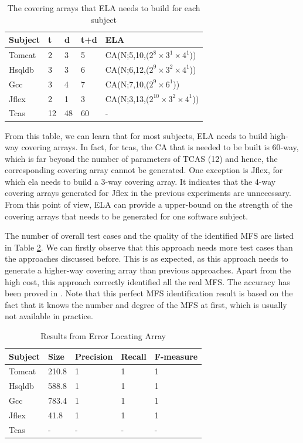 \documentclass[10pt,journal,compsoc]{IEEEtran}
\begin{document}
{\begin{table}[htbp]
\center
\caption{The covering arrays that ELA needs to build for each subject}
\label{ela-needs-to-gen}
\begin{tabular}{|l|l|l|l|l|}
\hline
Subject & t  & d  & t+d & ELA                       \\\hline
Tomcat  & 2  & 3  & 5   & CA(N;5,10,($2^{8} \times 3^{1} \times 4^{1}$))  \\
Hsqldb  & 3  & 3  & 6   & CA(N;6,12,($2^{9} \times 3^{2} \times 4^{1}$))  \\
Gcc     & 3  & 4  & 7   & CA(N;7,10,($2^{9} \times 6^{1}$))      \\
Jflex   & 2  & 1  & 3   & CA(N;3,13,($2^{10} \times 3^{2} \times 4^{1}$)) \\
Tcas    & 12 & 48 & 60  & -      \\ \hline
\end{tabular}
\end{table}
From this table, we can learn that for most subjects, ELA needs to build high-way covering arrays. In fact, for tcas, the CA that is needed to be built is 60-way, which is far beyond the number of parameters of TCAS (12) and hence, the corresponding covering array cannot be generated. One exception is Jflex, for which ela needs to build a 3-way covering array. It indicates that the 4-way covering arrays generated for Jflex in the previous experiments are unnecessary. From this point of view, ELA can provide a upper-bound on the strength of the covering arrays that needs to be generated for one software subject.


The number of overall test cases and the quality of the identified MFS are listed in Table \ref{cm_ela}. We can firstly observe that this approach needs more test cases than the approaches discussed before. This is as expected, as this approach needs to generate a higher-way covering array than previous approaches. Apart from the high cost, this approach correctly identified all the real MFS. The accuracy has been proved in \cite{martinez2008algorithms,martinez2009locating}.  Note that this perfect MFS identification result is based on the fact that it knows the number and degree of the MFS at first, which is usually not available in practice.  %


\begin{table}[htbp]
\center
\caption{Results from Error Locating Array}
\label{cm_ela}
\begin{tabular}{|l|l|l|l|l|}
\hline
Subject & Size   & Precision & Recall & F-measure \\ \hline
Tomcat  & 210.8  & 1       & 1      & 1         \\
Hsqldb  & 588.8  & 1       & 1      & 1         \\
Gcc      &783.4 & 1       & 1      & 1         \\
Jflex   & 41.8   & 1       & 1      & 1         \\
Tcas    & - &  -       & -      & -         \\ \hline
\end{tabular}
\end{table}


}
\end{document}
